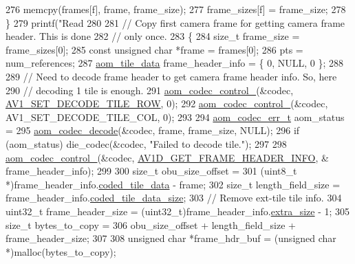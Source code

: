 \begin{DoxyCodeInclude}
{{{{{276     memcpy(frames[f], frame, frame\_size);
277     frame\_sizes[f] = frame\_size;
278   \}
279   printf(\textcolor{stringliteral}{"Read %
280 
281   \textcolor{comment}{// Copy first camera frame for getting camera frame header. This is done}
282   \textcolor{comment}{// only once.}
283   \{
284     \textcolor{keywordtype}{size\_t} frame\_size = frame\_sizes[0];
285     \textcolor{keyword}{const} \textcolor{keywordtype}{unsigned} \textcolor{keywordtype}{char} *frame = frames[0];
286     pts = num\_references;
287     \hyperlink{structaom__tile__data}{aom\_tile\_data} frame\_header\_info = \{ 0, NULL, 0 \};
288 
289     \textcolor{comment}{// Need to decode frame header to get camera frame header info. So, here}
290     \textcolor{comment}{// decoding 1 tile is enough.}
291     \hyperlink{group__codec_ga51eb332a40dcacc39000ab8e0be36b79}{aom\_codec\_control\_}(&codec, \hyperlink{group__aom__decoder_gga3865fd4b3192489baa9a5c3632ebe97bac056b4cf80427fd05e3c4c9fc46edb78}{AV1\_SET\_DECODE\_TILE\_ROW}, 0);
292     \hyperlink{group__codec_ga51eb332a40dcacc39000ab8e0be36b79}{aom\_codec\_control\_}(&codec, AV1\_SET\_DECODE\_TILE\_COL, 0);
293 
294     \hyperlink{group__codec_gaaae61e0f8663e6137f1e228757248e7c}{aom\_codec\_err\_t} aom\_status =
295         \hyperlink{group__decoder_gab03fdb999d1f83a5896869a3ba5f68f7}{aom\_codec\_decode}(&codec, frame, frame\_size, NULL);
296     \textcolor{keywordflow}{if} (aom\_status) die\_codec(&codec, \textcolor{stringliteral}{"Failed to decode tile."});
297 
298     \hyperlink{group__codec_ga51eb332a40dcacc39000ab8e0be36b79}{aom\_codec\_control\_}(&codec, \hyperlink{group__aom__decoder_gga3865fd4b3192489baa9a5c3632ebe97baed16ed4514ea1bd2847e607ca880b246}{AV1D\_GET\_FRAME\_HEADER\_INFO}, &
      frame\_header\_info);
299 
300     \textcolor{keywordtype}{size\_t} obu\_size\_offset =
301         (uint8\_t *)frame\_header\_info.\hyperlink{structaom__tile__data_a05898249ddaf5ba799dd471113b0e51e}{coded\_tile\_data} - frame;
302     \textcolor{keywordtype}{size\_t} length\_field\_size = frame\_header\_info.\hyperlink{structaom__tile__data_a4451b0bcd81b4959484745df35a9fbba}{coded\_tile\_data\_size};
303     \textcolor{comment}{// Remove ext-tile tile info.}
304     uint32\_t frame\_header\_size = (uint32\_t)frame\_header\_info.\hyperlink{structaom__tile__data_a936851e515bcea0af38d2d091f5adf65}{extra\_size} - 1;
305     \textcolor{keywordtype}{size\_t} bytes\_to\_copy =
306         obu\_size\_offset + length\_field\_size + frame\_header\_size;
307 
308     \textcolor{keywordtype}{unsigned} \textcolor{keywordtype}{char} *frame\_hdr\_buf = (\textcolor{keywordtype}{unsigned} \textcolor{keywordtype}{char} *)malloc(bytes\_to\_copy);
}}}}}}
\end{DoxyCodeInclude}
